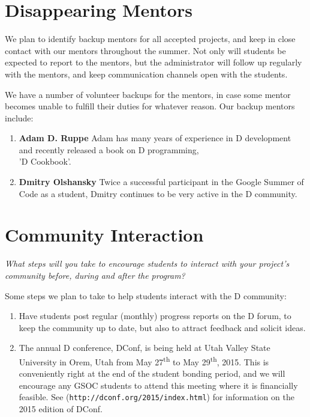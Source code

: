 \documentclass[	DIV=calc,%
							paper=a4,%
							fontsize=11pt,%
							twocolumn]{scrartcl}	 					%
\begin{document}
\section{Disappearing Mentors}

We plan to identify backup mentors for all accepted projects,
and keep in close contact with our mentors throughout the
summer.  Not only will students be expected to report to the mentors,
but the administrator will follow up regularly with the mentors, and
keep communication channels open with the students.

We have a number of volunteer backups for the mentors, in case
some mentor becomes unable to fulfill their duties for whatever
reason.  Our backup mentors include:

\begin{enumerate}
     \item \textbf{Adam D. Ruppe}  Adam has many years of experience in
     D development and recently released a book on D programming, \\
     'D Cookbook'.
     \item \textbf{Dmitry Olshansky}  Twice a successful participant
     in the Google Summer of Code as a student, Dmitry continues to be 
     very active in the D community. 
\end{enumerate}

\section{Community Interaction}
\emph{What steps will you take to encourage students to interact 
with your project's community before, during and after 
the program?}

Some steps we plan to take to help students interact with
the D community:

\begin{enumerate}
\item Have students post regular (monthly) progress reports
on the D forum, to keep the community up to date, but also
to attract feedback and solicit ideas.
\item The annual D conference, DConf, is being held at Utah
Valley State University in Orem, Utah from May 27\textsuperscript{th}
to May 29\textsuperscript{th}, 2015. This is conveniently right at 
the end of the student bonding period, and we will encourage any
GSOC students to attend this meeting where it is financially 
feasible. See (\texttt{http://dconf.org/2015/index.html}) for information on 
the 2015 edition of DConf.
\end{enumerate}
\end{document}
